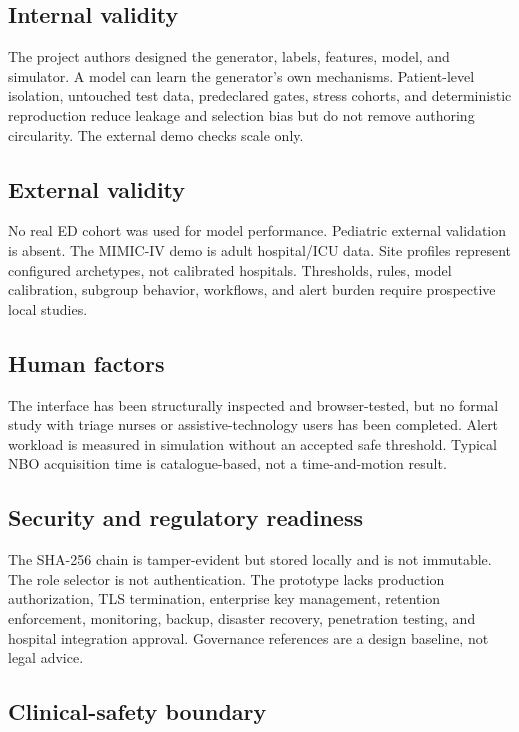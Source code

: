\documentclass[11pt,a4paper]{article}
\begin{document}
\subsection{Internal validity}

The project authors designed the generator, labels, features, model, and simulator. A model can learn the generator's own mechanisms. Patient-level isolation, untouched test data, predeclared gates, stress cohorts, and deterministic reproduction reduce leakage and selection bias but do not remove authoring circularity. The external demo checks scale only.

\subsection{External validity}

No real ED cohort was used for model performance. Pediatric external validation is absent. The MIMIC-IV demo is adult hospital/ICU data. Site profiles represent configured archetypes, not calibrated hospitals. Thresholds, rules, model calibration, subgroup behavior, workflows, and alert burden require prospective local studies.

\subsection{Human factors}

The interface has been structurally inspected and browser-tested, but no formal study with triage nurses or assistive-technology users has been completed. Alert workload is measured in simulation without an accepted safe threshold. Typical NBO acquisition time is catalogue-based, not a time-and-motion result.

\subsection{Security and regulatory readiness}

The SHA-256 chain is tamper-evident but stored locally and is not immutable. The role selector is not authentication. The prototype lacks production authorization, TLS termination, enterprise key management, retention enforcement, monitoring, backup, disaster recovery, penetration testing, and hospital integration approval. Governance references are a design baseline, not legal advice.

\subsection{Clinical-safety boundary}
\end{document}
